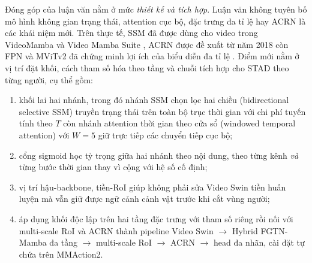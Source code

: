 Đóng góp của luận văn nằm ở mức \emph{thiết kế và tích hợp}. Luận văn không tuyên bố mô hình không gian trạng thái, attention cục bộ, đặc trưng đa tỉ lệ hay ACRN là các khái niệm mới. Trên thực tế, SSM đã được dùng cho video trong VideoMamba và Video Mamba Suite \cite{li2024videomamba,chen2024videomambasuite}, ACRN được đề xuất từ năm 2018 \cite{sun2018acrn} còn FPN và MViTv2 đã chứng minh lợi ích của biểu diễn đa tỉ lệ \cite{lin2017fpn,li2022mvitv2}. Điểm mới nằm ở vị trí đặt khối, cách tham số hóa theo tầng và chuỗi tích hợp cho STAD theo từng người, cụ thể gồm:
\begin{enumerate}[label=(\roman*)]
  \item khối lai hai nhánh, trong đó nhánh SSM chọn lọc hai chiều (bidirectional selective SSM) truyền trạng thái trên toàn bộ trục thời gian với chi phí tuyến tính theo $T$ còn nhánh attention thời gian theo cửa sổ (windowed temporal attention) với $W = 5$ giữ trực tiếp các chuyển tiếp cục bộ;
  \item cổng sigmoid học tỷ trọng giữa hai nhánh theo nội dung, theo từng kênh \emph{và} từng bước thời gian thay vì cộng với hệ số cố định;
  \item vị trí hậu-backbone, tiền-RoI giúp không phải sửa Video Swin tiền huấn luyện mà vẫn giữ được ngữ cảnh cảnh vật trước khi cắt vùng người;
  \item áp dụng khối độc lập trên hai tầng đặc trưng với tham số riêng rồi nối với multi-scale RoI và ACRN thành pipeline Video Swin $\rightarrow$ Hybrid FGTN-Mamba đa tầng $\rightarrow$ multi-scale RoI $\rightarrow$ ACRN $\rightarrow$ head đa nhãn, cài đặt tự chứa trên MMAction2.
\end{enumerate}

%
%

